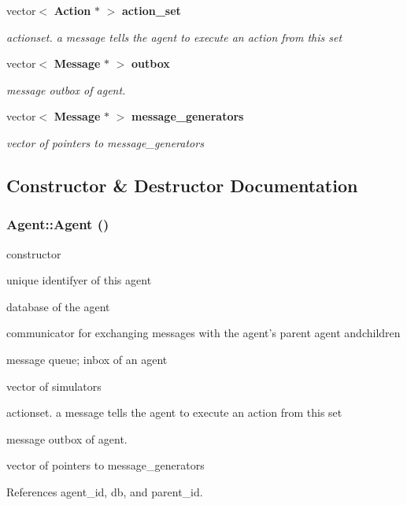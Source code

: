 \begin{CompactItemize}
vector$<$ {\bf Action} $\ast$ $>$ {\bf action\_\-set}
\begin{CompactList}\small\item\em actionset. a message tells the agent to execute an action from this set \item\end{CompactList}\item 
vector$<$ {\bf Message} $\ast$ $>$ {\bf outbox}
\begin{CompactList}\small\item\em message outbox of agent. \item\end{CompactList}\item 
vector$<$ {\bf Message} $\ast$ $>$ {\bf message\_\-generators}
\begin{CompactList}\small\item\em vector of pointers to message\_\-generators \item\end{CompactList}\end{CompactItemize}


\subsection{Constructor \& Destructor Documentation}
\subsubsection[Agent]{\setlength{\rightskip}{0pt plus 5cm}Agent::Agent ()}\label{classAgent_24a60f1d260bf19a4f7f8a5f36881d3f}


constructor 



unique identifyer of this agent

database of the agent

communicator for exchanging messages with the agent's parent agent andchildren

message queue; inbox of an agent

vector of simulators

actionset. a message tells the agent to execute an action from this set

message outbox of agent.

vector of pointers to message\_\-generators 

References agent\_\-id, db, and parent\_\-id.

